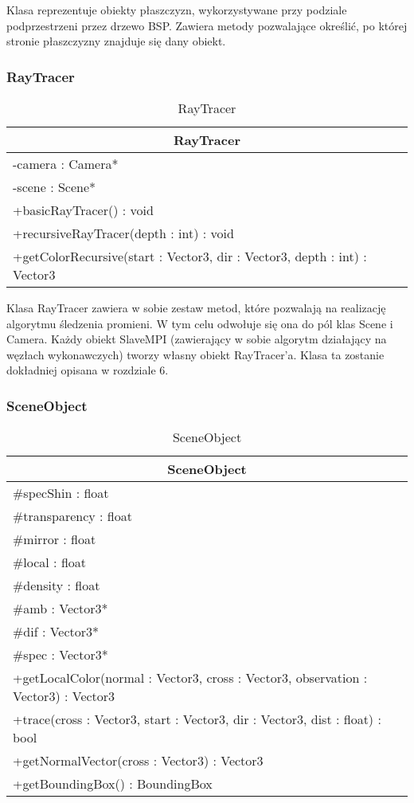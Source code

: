 Klasa reprezentuje obiekty płaszczyzn, wykorzystywane przy podziale podprzestrzeni przez drzewo BSP. Zawiera metody pozwalające określić, po której stronie płaszczyzny znajduje się dany obiekt.

\subsubsection{RayTracer}

\footnotesize
\begin{longtable}{|p{14cm}|}
    \caption{RayTracer} \label{tab:RayTracer} \\ \hline
    \multicolumn{1}{|c|}{RayTracer} \\ \hline
    -camera : Camera* \\
    -scene : Scene* \\ \hline
	+basicRayTracer() : void \\
	+recursiveRayTracer(depth : int) : void \\
	+getColorRecursive(start : Vector3, dir : Vector3, depth : int) : Vector3 \\
	\hline
\end{longtable}
\normalsize

Klasa RayTracer zawiera w sobie zestaw metod, które pozwalają na realizację algorytmu śledzenia promieni. W tym celu odwołuje się ona do pól klas Scene i Camera. Każdy obiekt SlaveMPI (zawierający w sobie algorytm działający na węzłach wykonawczych) tworzy własny obiekt RayTracer'a. Klasa ta zostanie dokładniej opisana w rozdziale 6.

\subsubsection{SceneObject}

\footnotesize
\begin{longtable}{|p{14cm}|}
    \caption{SceneObject} \label{tab:SceneObject} \\ \hline
    \multicolumn{1}{|c|}{SceneObject} \\ \hline
    \#specShin : float \\
    \#transparency : float \\
    \#mirror : float \\
    \#local : float \\
    \#density : float \\
    \#amb : Vector3* \\
    \#dif : Vector3* \\
    \#spec : Vector3* \\
    \hline
	+getLocalColor(normal : Vector3, cross : Vector3, observation : Vector3) : Vector3 \\
	+trace(cross : Vector3, start : Vector3, dir : Vector3, dist : float) : bool \\
	+getNormalVector(cross : Vector3) : Vector3 \\
	+getBoundingBox() : BoundingBox \\
	\hline
\end{longtable}
\normalsize

